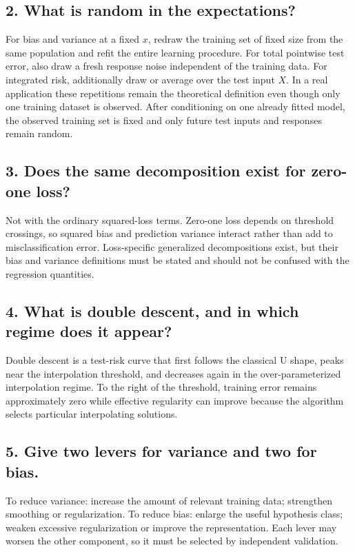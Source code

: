 \documentclass[11pt,a4paper]{article}
\begin{document}
\subsection*{2. What is random in the expectations?}

For bias and variance at a fixed $x$, redraw the training set of fixed size from the same population and refit the entire learning procedure. For total pointwise test error, also draw a fresh response noise independent of the training data. For integrated risk, additionally draw or average over the test input $X$. In a real application these repetitions remain the theoretical definition even though only one training dataset is observed. After conditioning on one already fitted model, the observed training set is fixed and only future test inputs and responses remain random.

\subsection*{3. Does the same decomposition exist for zero-one loss?}

Not with the ordinary squared-loss terms. Zero-one loss depends on threshold crossings, so squared bias and prediction variance interact rather than add to misclassification error. Loss-specific generalized decompositions exist, but their bias and variance definitions must be stated and should not be confused with the regression quantities.

\subsection*{4. What is double descent, and in which regime does it appear?}

Double descent is a test-risk curve that first follows the classical U shape, peaks near the interpolation threshold, and decreases again in the over-parameterized interpolation regime. To the right of the threshold, training error remains approximately zero while effective regularity can improve because the algorithm selects particular interpolating solutions.

\subsection*{5. Give two levers for variance and two for bias.}

To reduce variance: increase the amount of relevant training data; strengthen smoothing or regularization. To reduce bias: enlarge the useful hypothesis class; weaken excessive regularization or improve the representation. Each lever may worsen the other component, so it must be selected by independent validation.
\end{document}
